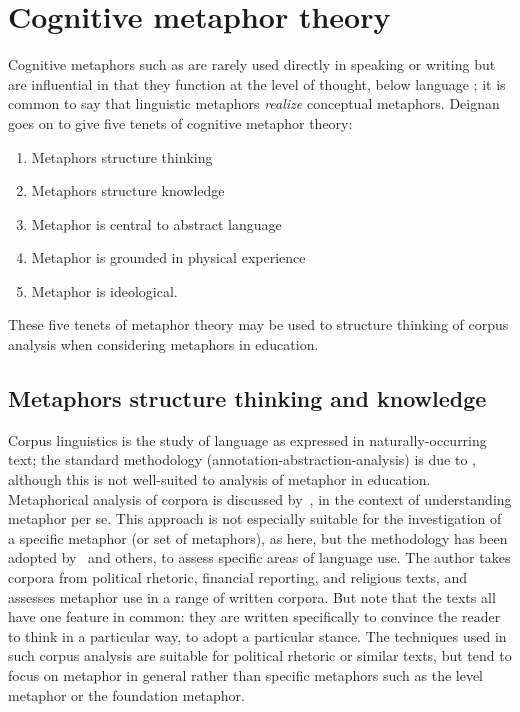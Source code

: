 \section{Cognitive metaphor theory}

Cognitive metaphors such as  are
rarely used directly in speaking or writing but are influential in
that they function at the level of thought, below language
\parencite{deignan2005}; it is common to say that linguistic metaphors
          {\em realize} conceptual metaphors.  Deignan goes on to give
          five tenets of cognitive metaphor theory:

\begin{enumerate}
\item Metaphors structure thinking
\item Metaphors structure knowledge
\item Metaphor is central to abstract language
\item Metaphor is grounded in physical experience
\item Metaphor is ideological.
\end{enumerate}

These five tenets of metaphor theory may be used to structure thinking
of corpus analysis when considering metaphors in education.

\subsection{Metaphors structure thinking and knowledge}

Corpus linguistics is the study of language as expressed in naturally-occurring
text; the standard methodology (annotation-abstraction-analysis) is
due to , although this is not well-suited to
analysis of metaphor in education.  Metaphorical analysis of corpora is discussed
by~, in the context of understanding metaphor per
se.  This approach is not especially suitable for the investigation of
a specific metaphor (or set of metaphors), as here, but the
methodology has been adopted by~ and
others, to assess specific areas of language use.  The author takes
corpora from political rhetoric, financial reporting, and religious
texts, and assesses metaphor use in a range of written corpora.  But
note that the texts all have one feature in common: they are written
specifically to convince the reader to think in a particular way, to
adopt a particular stance. The techniques used in such corpus analysis
are suitable for political rhetoric or similar texts, but tend to
focus on metaphor in general rather than specific metaphors such as
the level metaphor or the foundation metaphor.

